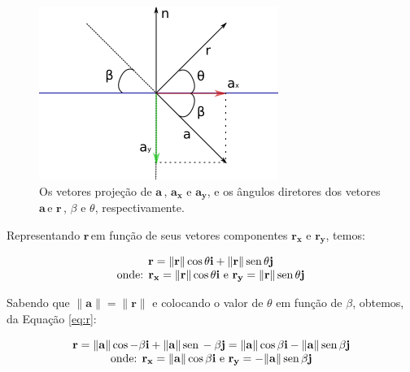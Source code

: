 \documentclass[a4paper,11pt,pagenumber=true]{article}
\newcommand{\veca}{$\mathbf{a\,}$}
\newcommand{\vecr}{$\mathbf{r\,}$}
\newcommand{\vecnorm}[1]{\|\mathbf{#1}\|}
\renewcommand{\sin}{\text{\,sen\,}}
\theoremstyle{mytheor}
\begin{document}
            \begin{figure}[h]
                \centering
                \includegraphics{images/Q-1-A-2.png}
                \caption{
                        Os vetores projeção de \veca, $\mathbf{a_x}$ e $\mathbf{a_y}$, e os ângulos diretores dos vetores \veca e \vecr, $\beta$ e $\theta$, respectivamente.  
                    }
                \label{fig:q1a2}
            \end{figure}

            Representando \vecr em função de seus vetores componentes $\mathbf{r_x}$ e $\mathbf{r_y}$, temos:
            
            \begin{equation}
                \begin{matrix}
                    \mathbf{r} = \vecnorm{r} \cos \theta \mathbf{i} + \vecnorm{r} \sin \theta \mathbf{j} \\
                    \text{onde: } 
                        \mathbf{r_x} = \vecnorm{r} \cos \theta \mathbf{i} \text{ e } 
                        \mathbf{r_y} = \vecnorm{r} \sin \theta \mathbf{j}
                \end{matrix}
                \label{eq:r}
            \end{equation}
            
            Sabendo que $\vecnorm{a} = \vecnorm{r}$ e colocando o valor de $\theta$ em função de $\beta$, obtemos, da Equação \ref{eq:r}:
            
            \begin{equation*}
                \begin{matrix}
                    \mathbf{r} = \vecnorm{a} \cos -\beta \mathbf{i} + \vecnorm{a} \sin -\beta \mathbf{j} 
                               = \vecnorm{a} \cos \beta \mathbf{i} - \vecnorm{a} \sin \beta \mathbf{j} \\
                    \text{onde: } 
                        \mathbf{r_x} = \vecnorm{a} \cos \beta \mathbf{i} \text{ e } 
                        \mathbf{r_y} = -\vecnorm{a} \sin \beta \mathbf{j} 
                \end{matrix} 
            \end{equation*}
            
\end{document}
